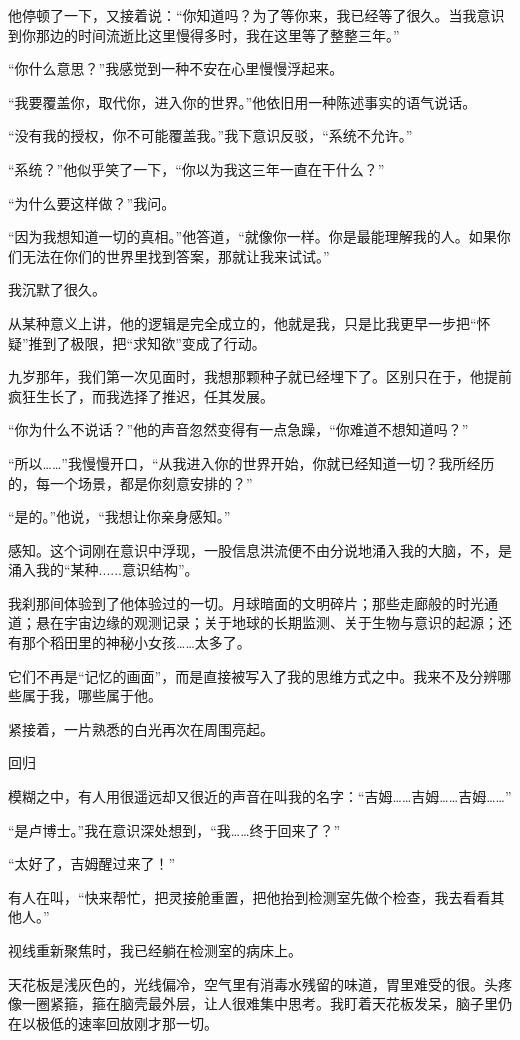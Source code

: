 他停顿了一下，又接着说：“你知道吗？为了等你来，我已经等了很久。当我意识到你那边的时间流逝比这里慢得多时，我在这里等了整整三年。”

“你什么意思？”我感觉到一种不安在心里慢慢浮起来。

“我要覆盖你，取代你，进入你的世界。”他依旧用一种陈述事实的语气说话。

“没有我的授权，你不可能覆盖我。”我下意识反驳，“系统不允许。”

“系统？”他似乎笑了一下，“你以为我这三年一直在干什么？”

“为什么要这样做？”我问。

“因为我想知道一切的真相。”他答道，“就像你一样。你是最能理解我的人。如果你们无法在你们的世界里找到答案，那就让我来试试。”

我沉默了很久。

从某种意义上讲，他的逻辑是完全成立的，他就是我，只是比我更早一步把“怀疑”推到了极限，把“求知欲”变成了行动。

九岁那年，我们第一次见面时，我想那颗种子就已经埋下了。区别只在于，他提前疯狂生长了，而我选择了推迟，任其发展。

“你为什么不说话？”他的声音忽然变得有一点急躁，“你难道不想知道吗？”

“所以……”我慢慢开口，“从我进入你的世界开始，你就已经知道一切？我所经历的，每一个场景，都是你刻意安排的？”

“是的。”他说，“我想让你亲身感知。”

感知。这个词刚在意识中浮现，一股信息洪流便不由分说地涌入我的大脑，不，是涌入我的“某种......意识结构”。

我刹那间体验到了他体验过的一切。月球暗面的文明碎片；那些走廊般的时光通道；悬在宇宙边缘的观测记录；关于地球的长期监测、关于生物与意识的起源；还有那个稻田里的神秘小女孩……太多了。

它们不再是“记忆的画面”，而是直接被写入了我的思维方式之中。我来不及分辨哪些属于我，哪些属于他。

紧接着，一片熟悉的白光再次在周围亮起。

回归

模糊之中，有人用很遥远却又很近的声音在叫我的名字：“吉姆……吉姆……吉姆……”

“是卢博士。”我在意识深处想到，“我……终于回来了？”

“太好了，吉姆醒过来了！”

有人在叫，“快来帮忙，把灵接舱重置，把他抬到检测室先做个检查，我去看看其他人。”

视线重新聚焦时，我已经躺在检测室的病床上。

天花板是浅灰色的，光线偏冷，空气里有消毒水残留的味道，胃里难受的很。头疼像一圈紧箍，箍在脑壳最外层，让人很难集中思考。我盯着天花板发呆，脑子里仍在以极低的速率回放刚才那一切。

